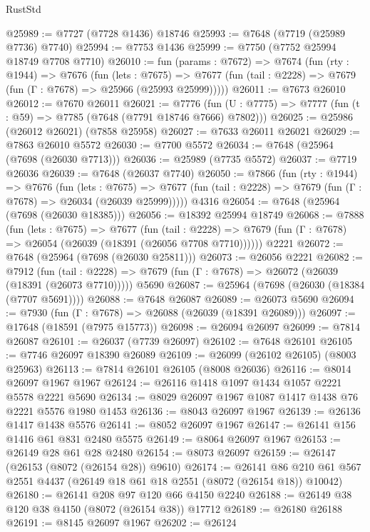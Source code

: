 \begin{lexlean}{RustStd}
\begin{coremodule}
@25989 := @7727 (@7728 @1436) @18746
@25993 := @7648 (@7719 (@25989 @7736) @7740)
@25994 := @7753 @1436
@25999 := @7750 (@7752 @25994 @18749 @7708 @7710)
@26010 := fun (params : @7672) =>
  @7674
    (fun (rty : @1944) =>
    @7676
      (fun (lets : @7675) =>
      @7677 (fun (tail : @2228) => @7679 (fun (Γ : @7678) => @25966 (@25993 @25999)))))
@26011 := @7673 @26010
@26012 := @7670 @26011
@26021 := @7776
    (fun (U : @7775) => @7777 (fun (t : @59) => @7785 (@7648 (@7791 @18746 @7666) @7802)))
@26025 := @25986 (@26012 @26021) (@7858 @25958)
@26027 := @7633 @26011 @26021
@26029 := @7863 @26010 @5572
@26030 := @7700 @5572
@26034 := @7648 (@25964 (@7698 (@26030 @7713)))
@26036 := @25989 (@7735 @5572)
@26037 := @7719 @26036
@26039 := @7648 (@26037 @7740)
@26050 := @7866
    (fun (rty : @1944) =>
    @7676
      (fun (lets : @7675) =>
      @7677 (fun (tail : @2228) => @7679 (fun (Γ : @7678) => @26034 (@26039 @25999)))))
    @4316
@26054 := @7648 (@25964 (@7698 (@26030 @18385)))
@26056 := @18392 @25994 @18749
@26068 := @7888
    (fun (lets : @7675) =>
    @7677
      (fun (tail : @2228) =>
      @7679 (fun (Γ : @7678) => @26054 (@26039 (@18391 (@26056 @7708 @7710))))))
    @2221
@26072 := @7648 (@25964 (@7698 (@26030 @25811)))
@26073 := @26056 @2221
@26082 := @7912
    (fun (tail : @2228) => @7679 (fun (Γ : @7678) => @26072 (@26039 (@18391 (@26073 @7710)))))
    @5690
@26087 := @25964 (@7698 (@26030 (@18384 (@7707 @5691))))
@26088 := @7648 @26087
@26089 := @26073 @5690
@26094 := @7930 (fun (Γ : @7678) => @26088 (@26039 (@18391 @26089)))
@26097 := @17648 (@18591 (@7975 @15773))
@26098 := @26094 @26097
@26099 := @7814 @26087
@26101 := @26037 (@7739 @26097)
@26102 := @7648 @26101
@26105 := @7746 @26097 @18390 @26089
@26109 := @26099 (@26102 @26105) (@8003 @25963)
@26113 := @7814 @26101 @26105 (@8008 @26036)
@26116 := @8014 @26097 @1967 @1967
@26124 := @26116 @1418 @1097 @1434 @1057 @2221 @5578 @2221 @5690
@26134 := @8029 @26097 @1967 @1087 @1417 @1438 @76 @2221 @5576 @1980 @1453
@26136 := @8043 @26097 @1967
@26139 := @26136 @1417 @1438 @5576
@26141 := @8052 @26097 @1967
@26147 := @26141 @156 @1416 @61 @831 @2480 @5575
@26149 := @8064 @26097 @1967
@26153 := @26149 @28 @61 @28 @2480
@26154 := @8073 @26097
@26159 := @26147 (@26153 (@8072 (@26154 @28)) @9610)
@26174 := @26141
    @86
    @210
    @61
    @567
    @2551
    @4437
    (@26149 @18 @61 @18 @2551 (@8072 (@26154 @18)) @10042)
@26180 := @26141 @208 @97 @120 @66 @4150 @2240
@26188 := @26149 @38 @120 @38 @4150 (@8072 (@26154 @38)) @17712
@26189 := @26180 @26188
@26191 := @8145 @26097 @1967
@26202 := @26124

\end{coremodule}
\end{lexlean}
